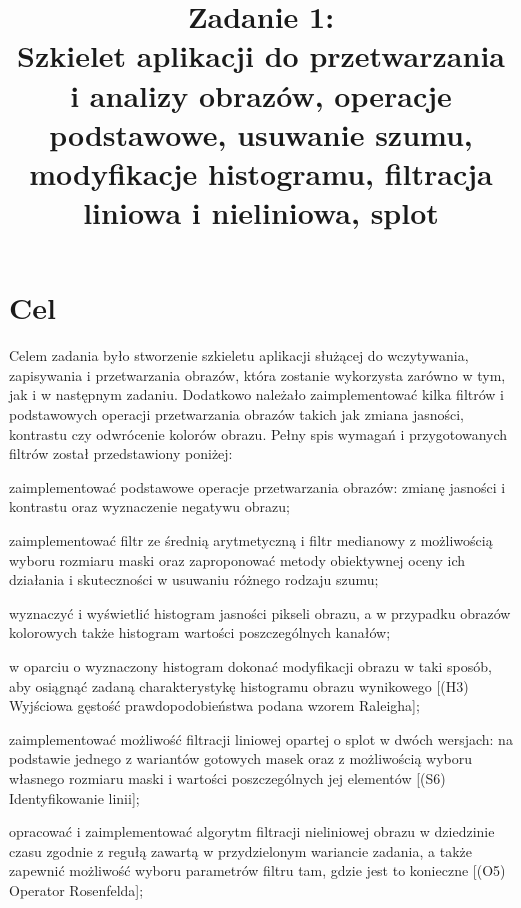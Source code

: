 \documentclass{classrep}
\author{
  \studentinfo{Paweł Musiał}{178726} \and
  \studentinfo{Łukasz Michalski}{178724}
}
\title{Zadanie 1:\\  \textbf {Szkielet aplikacji do przetwarzania \\i analizy obrazów, operacje podstawowe, usuwanie szumu, modyfikacje histogramu, filtracja liniowa i nieliniowa, splot}}
\begin{document}
\maketitle

\addtocounter{footnote}{1}

\tableofcontents

\section{Cel}

Celem zadania było stworzenie szkieletu aplikacji służącej do wczytywania, zapisywania i  przetwarzania obrazów, która zostanie wykorzysta zarówno w tym, jak i w następnym zadaniu. Dodatkowo należało zaimplementować kilka filtrów i podstawowych operacji przetwarzania obrazów takich jak zmiana jasności, kontrastu czy odwrócenie kolorów obrazu. Pełny spis wymagań i przygotowanych filtrów został przedstawiony poniżej:

\begin{list}{•}{}
\item zaimplementować podstawowe operacje przetwarzania obrazów: zmianę jasności i kontrastu oraz wyznaczenie negatywu obrazu;
\item zaimplementować filtr ze średnią arytmetyczną i filtr medianowy z możliwością wyboru rozmiaru maski oraz zaproponować metody obiektywnej oceny ich działania i skuteczności w usuwaniu różnego rodzaju szumu;
\item wyznaczyć i wyświetlić histogram jasności pikseli obrazu, a w przypadku
obrazów kolorowych także histogram wartości poszczególnych kanałów;
\item w oparciu o wyznaczony histogram dokonać modyfikacji obrazu w taki sposób, aby osiągnąć zadaną charakterystykę histogramu obrazu wynikowego [(H3) Wyjściowa gęstość prawdopodobieństwa podana wzorem Raleigha];
\item zaimplementować możliwość filtracji liniowej opartej o splot w dwóch wersjach: na podstawie jednego z wariantów gotowych masek oraz z możliwością wyboru własnego rozmiaru maski i wartości poszczególnych jej elementów [(S6) Identyfikowanie linii];
\item opracować i zaimplementować algorytm filtracji nieliniowej obrazu w dziedzinie czasu zgodnie z regułą zawartą w przydzielonym wariancie zadania, a także zapewnić możliwość wyboru parametrów filtru tam, gdzie jest to konieczne [(O5) Operator Rosenfelda];
\end{list}
\end{document}
